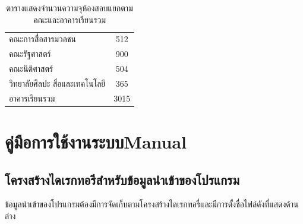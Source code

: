 \begin{table}[h]
\begin{tabular}{@{}lc@{}}
  คณะการสื่อสารมวลชน                      & 512                                                   \\
  คณะรัฐศาสตร์                            & 900                                                   \\
  คณะนิติศาสตร์                           & 504                                                   \\
  วิทยาลัยศิลปะ สื่อและเทคโนโลยี          & 365                                                   \\
  อาคารเรียนรวม                           & 3015                                                  \\ \bottomrule
  \end{tabular}
  \caption{ตารางแสดงจำนวนความจุห้องสอบแยกตามคณะและอาคารเรียนรวม}
  \label{tab:faculty_capa}
\end{table}

\chapter{\ifcpe คู่มือการใช้งานระบบ\else Manual\fi}
\section{โครงสร้างไดเรกทอรีสำหรับข้อมูลนำเข้าของโปรแกรม}
\label{apd:snd_apd}
ข้อมูลนำเข้าของโปรแกรมต้องมีการจัดเก็บตามโครงสร้างไดเรกทอรี่และมีการตั้งชื่อไฟล์ดังที่แสดงด้านล่าง

